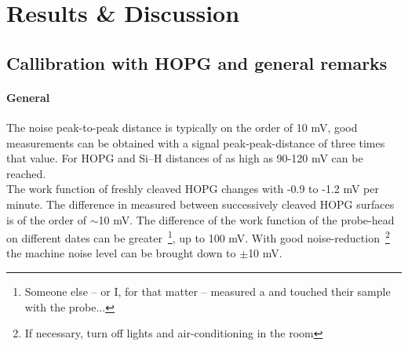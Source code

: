 \documentclass[a4paper,10pt]{article}
\newcommand{\sih}{Si--H}
\newcommand{\cpd}{\text{CPD}}
\newcommand{\hopg}{HOPG}
\begin{document}
\section{Results \& Discussion}
\subsection{Callibration with \hopg{} and general remarks}
\paragraph{General}
The noise peak-to-peak distance is typically on the order of 10 mV, good measurements can be obtained with a signal peak-peak-distance of three times that value. For \hopg{} and \sih{} distances of as high as 90-120 mV can be reached.\\
The work function of freshly cleaved \hopg{} changes with -0.9 to -1.2 mV per minute. The difference in measured \cpd{} between successively cleaved \hopg{} surfaces is of the order of $\sim$10 mV. The difference of the work function of the probe-head on different dates can be greater~\footnote{Someone else -- or I, for that matter -- measured a \cpd{} and touched their sample with the probe...}, up to 100 mV. With good noise-reduction~\footnote{If necessary, turn off lights and air-conditioning in the room} the machine noise level can be brought down to $\pm$10 mV.
\end{document}
